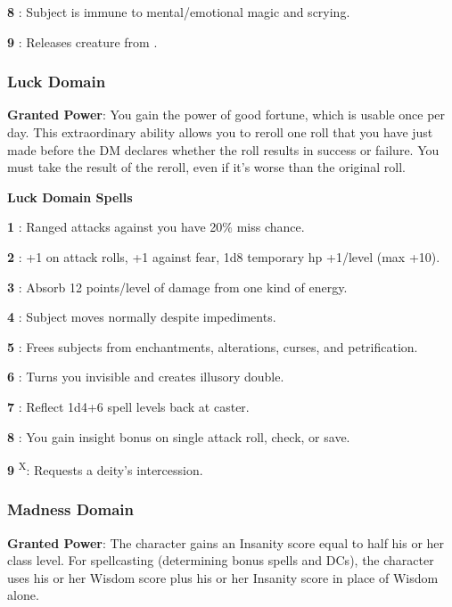 \textbf{8} : Subject is immune to mental/emotional magic and scrying.

\textbf{9} : Releases creature from .

\subsubsection{Luck Domain}

\textbf{Granted Power}: You gain the power of good fortune, which is usable once per day. This extraordinary ability allows you to reroll one roll that you have just made before the DM declares whether the roll results in success or failure. 
You must take the result of the reroll, even if it's worse than the original roll.

\textbf{Luck Domain Spells}

\textbf{1} : Ranged attacks against you have 20\% miss chance.

\textbf{2} : +1 on attack rolls, +1 against fear, 1d8 temporary hp +1/level 
(max +10).

\textbf{3} : Absorb 12 points/level of damage from one kind of energy.

\textbf{4} : Subject moves normally despite impediments.

\textbf{5} : Frees subjects from enchantments, alterations, curses, and petrification.

\textbf{6} : Turns you invisible and creates illusory double.

\textbf{7} : Reflect 1d4+6 spell levels back at caster.

\textbf{8} : You gain insight bonus on single attack roll, check, or save.

\textbf{9} \textsuperscript{X}: Requests a deity's intercession.

\subsubsection{Madness Domain}

\textbf{Granted Power}: The character gains an Insanity score equal to half his or her class level. For spellcasting (determining bonus spells and DCs), the character uses his or her Wisdom score plus his or her Insanity score in place of Wisdom alone.

